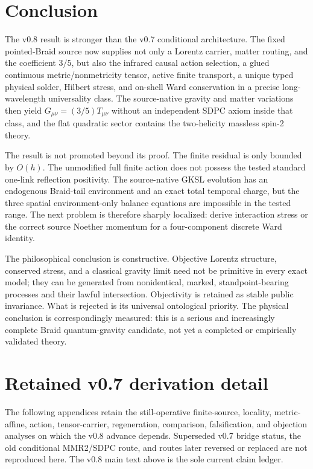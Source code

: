 \documentclass[11pt]{article}
\theoremstyle{definition}
\theoremstyle{remark}
\begin{document}
\section{Conclusion}

The v0.8 result is stronger than the v0.7 conditional architecture. The fixed pointed-Braid source now supplies not only a Lorentz carrier, matter routing, and the coefficient $3/5$, but also the infrared causal action selection, a glued continuous metric/nonmetricity tensor, active finite transport, a unique typed physical solder, Hilbert stress, and on-shell Ward conservation in a precise long-wavelength universality class. The source-native gravity and matter variations then yield $G_{\mu\nu}=(3/5)T_{\mu\nu}$ without an independent SDPC axiom inside that class, and the flat quadratic sector contains the two-helicity massless spin-2 theory.

The result is not promoted beyond its proof. The finite residual is only bounded by $O(h)$. The unmodified full finite action does not possess the tested standard one-link reflection positivity. The source-native GKSL evolution has an endogenous Braid-tail environment and an exact total temporal charge, but the three spatial environment-only balance equations are impossible in the tested range. The next problem is therefore sharply localized: derive interaction stress or the correct source Noether momentum for a four-component discrete Ward identity.

The philosophical conclusion is constructive. Objective Lorentz structure, conserved stress, and a classical gravity limit need not be primitive in every exact model; they can be generated from nonidentical, marked, standpoint-bearing processes and their lawful intersection. Objectivity is retained as stable public invariance. What is rejected is its universal ontological priority. The physical conclusion is correspondingly measured: this is a serious and increasingly complete Braid quantum-gravity candidate, not yet a completed or empirically validated theory.

\appendix
\section*{Retained v0.7 derivation detail}

The following appendices retain the still-operative finite-source, locality, metric-affine, action, tensor-carrier, regeneration, comparison, falsification, and objection analyses on which the v0.8 advance depends. Superseded v0.7 bridge status, the old conditional MMR2/SDPC route, and routes later reversed or replaced are not reproduced here. The v0.8 main text above is the sole current claim ledger.
\end{document}
